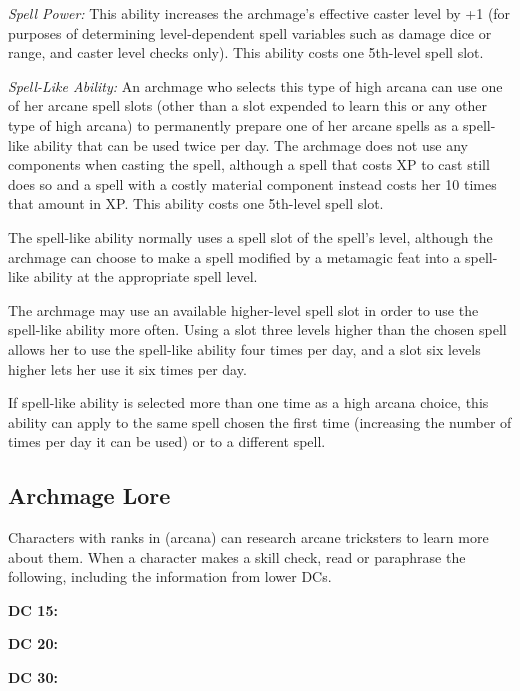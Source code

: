 \textit{Spell Power:} This ability increases the archmage's effective caster level by +1 (for purposes of determining level-dependent spell variables such as damage dice or range, and caster level checks only). This ability costs one 5th-level spell slot.

\textit{Spell-Like Ability:} An archmage who selects this type of high arcana can use one of her arcane spell slots (other than a slot expended to learn this or any other type of high arcana) to permanently prepare one of her arcane spells as a spell-like ability that can be used twice per day. The archmage does not use any components when casting the spell, although a spell that costs XP to cast still does so and a spell with a costly material component instead costs her 10 times that amount in XP. This ability costs one 5th-level spell slot.

The spell-like ability normally uses a spell slot of the spell's level, although the archmage can choose to make a spell modified by a metamagic feat into a spell-like ability at the appropriate spell level.

The archmage may use an available higher-level spell slot in order to use the spell-like ability more often. Using a slot three levels higher than the chosen spell allows her to use the spell-like ability four times per day, and a slot six levels higher lets her use it six times per day.

If spell-like ability is selected more than one time as a high arcana choice, this ability can apply to the same spell chosen the first time (increasing the number of times per day it can be used) or to a different spell.

\subsection{Archmage Lore}
Characters with ranks in  (arcana) can research arcane tricksters to learn more about them. When a character makes a skill check, read or paraphrase the following, including the information from lower DCs.

\textbf{DC 15:}

\textbf{DC 20:}

\textbf{DC 30:}